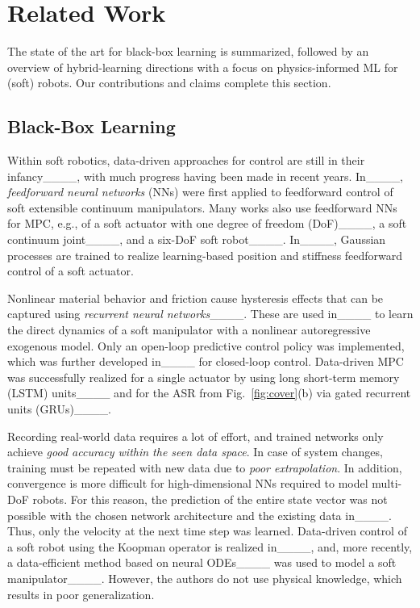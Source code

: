 \section{Related Work}
\label{relatedwork}
The state of the art for black-box learning is summarized, followed by an overview of hybrid-learning directions with a focus on physics-informed ML for (soft) robots. 
Our contributions and claims complete this section.
\subsection{Black-Box Learning}
Within soft robotics, data-driven approaches for control are still in their infancy____, with much progress having been made in recent years. 
In____, \textit{feedforward neural networks} (NNs) were first applied to feedforward control of soft extensible continuum manipulators. 
Many works also use feedforward NNs for MPC, e.g., of a soft actuator with one degree of freedom (DoF)____, a soft continuum joint____, and a six-DoF soft robot____.
In____, Gaussian processes are trained to realize learning-based position and stiffness feedforward control of a soft actuator.

Nonlinear material behavior and friction cause hysteresis effects that can be captured using \textit{recurrent neural networks}____. 
These are used in____ to learn the direct dynamics of a soft manipulator with a nonlinear autoregressive exogenous model. 
Only an open-loop predictive control policy was implemented, which was further developed in____ for closed-loop control.
Data-driven MPC was successfully realized for a single actuator by using long short-term memory (LSTM) units____ and for the ASR from Fig.~\ref{fig:cover}(b) via gated recurrent units (GRUs)____.

Recording real-world data requires a lot of effort, and trained networks only achieve \textit{good accuracy within the seen data space}.
In case of system changes, training must be repeated with new data due to\textit{ poor extrapolation}. 
In addition, convergence is more difficult for high-dimensional NNs required to model multi-DoF robots. 
For this reason, the prediction of the entire state vector was not possible with the chosen network architecture and the existing data in____.
Thus, only the velocity at the next time step was learned. 
Data-driven control of a soft robot using the Koopman operator is realized in____, and, more recently, a data-efficient method based on neural ODEs____ was used to model a soft manipulator____. 
However, the authors do not use physical knowledge, which results in poor generalization.

